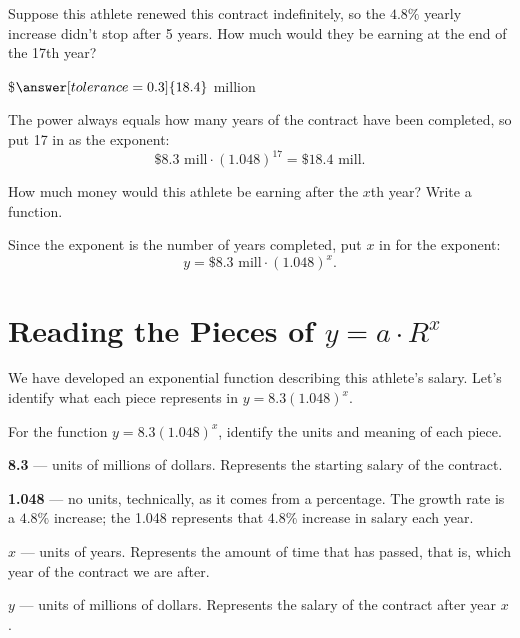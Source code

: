 \documentclass[12pt]{ximera}
\begin{document}
\begin{problem}
Suppose this athlete renewed this contract indefinitely, so the $4.8\%$ yearly increase
didn't stop after 5 years. How much would they be earning at the end of the 17th year?

\$$\answer[tolerance=0.3]{18.4}$ million

\begin{solution}
The power always equals how many years of the contract have been completed, so put 17 in
as the exponent:
\[
\$8.3 \text{ mill} \cdot (1.048)^{17} = \$18.4 \text{ mill}.
\]
\end{solution}
\end{problem}

\begin{problem}
How much money would this athlete be earning after the $x$th year? Write a function.

\begin{freeResponse}
\end{freeResponse}

\begin{solution}
Since the exponent is the number of years completed, put $x$ in for the exponent:
\[
y = \$8.3 \text{ mill} \cdot (1.048)^x.
\]
\end{solution}
\end{problem}

\section*{Reading the Pieces of $y = a \cdot R^x$}

We have developed an exponential function describing this athlete's salary. Let's
identify what each piece represents in $y = 8.3(1.048)^x$.

\begin{problem}
For the function $y = 8.3(1.048)^x$, identify the units and meaning of each piece.

\begin{freeResponse}
\end{freeResponse}

\begin{solution}
\textbf{8.3} --- units of millions of dollars. Represents the starting salary of the
contract.

\textbf{1.048} --- no units, technically, as it comes from a percentage. The growth rate
is a $4.8\%$ increase; the 1.048 represents that $4.8\%$ increase in salary each year.

\textbf{$x$} --- units of years. Represents the amount of time that has passed, that is,
which year of the contract we are after.

\textbf{$y$} --- units of millions of dollars. Represents the salary of the contract
after year $x$.
\end{solution}
\end{problem}
\end{document}
